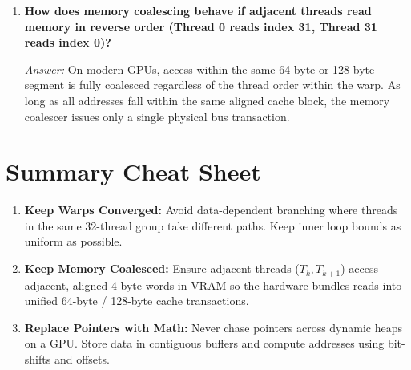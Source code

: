 \documentclass[a4paper,11pt]{article}
\begin{document}
\begin{enumerate}[leftmargin=2.0em, label=\textbf{Q\arabic*:}]
  \textit{Answer:} \textbf{No.} Warp divergence strictly occurs \textit{within} an individual warp (the 32 threads executing together). If Warp 0 takes Branch A and Warp 1 takes Branch B, there is no divergence penalty because Warp 0 and Warp 1 have separate instruction dispatch contexts and can execute independently.

  \item \textbf{How does memory coalescing behave if adjacent threads read memory in reverse order (Thread 0 reads index 31, Thread 31 reads index 0)?}
  
  \textit{Answer:} On modern GPUs, access within the same 64-byte or 128-byte segment is fully coalesced regardless of the thread order within the warp. As long as all addresses fall within the same aligned cache block, the memory coalescer issues only a single physical bus transaction.
\end{enumerate}

\section{Summary Cheat Sheet}

\begin{conceptbox}
\begin{enumerate}
  \item \textbf{Keep Warps Converged:} Avoid data-dependent branching where threads in the same 32-thread group take different paths. Keep inner loop bounds as uniform as possible.
  \item \textbf{Keep Memory Coalesced:} Ensure adjacent threads ($T_k, T_{k+1}$) access adjacent, aligned 4-byte words in VRAM so the hardware bundles reads into unified 64-byte / 128-byte cache transactions.
  \item \textbf{Replace Pointers with Math:} Never chase pointers across dynamic heaps on a GPU. Store data in contiguous buffers and compute addresses using bit-shifts and offsets.
\end{enumerate}
\end{conceptbox}
\end{document}
